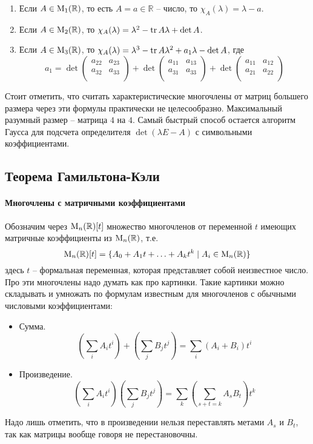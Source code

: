 \begin{enumerate}
\item Если $A\in\operatorname{M}_{1}(\mathbb R)$, то есть $A = a\in\mathbb R$ -- число, то $\chi_A(\lambda) = \lambda - a$.

\item Если $A\in\operatorname{M}_{2}(\mathbb R)$, то $\chi_A(\lambda) = \lambda^2 - \operatorname{tr} A \lambda + \det A$.

\item Если $A\in\operatorname{M}_{3}(\mathbb R)$, то $\chi_A(\lambda) = \lambda^3 - \operatorname{tr} A \lambda^2 + a_1 \lambda - \det A$, где
\[
a_1 = 
\det
\begin{pmatrix}
{a_{22}}&{a_{23}}\\
{a_{32}}&{a_{33}}\\
\end{pmatrix}
+
\det
\begin{pmatrix}
{a_{11}}&{a_{13}}\\
{a_{31}}&{a_{33}}\\
\end{pmatrix}
+
\det
\begin{pmatrix}
{a_{11}}&{a_{12}}\\
{a_{21}}&{a_{22}}\\
\end{pmatrix}
\]
\end{enumerate}

Стоит отметить, что считать характеристические многочлены от матриц большего размера через эти формулы практически не целесообразно. Максимальный разумный размер -- матрица $4$ на $4$. Самый быстрый способ остается алгоритм Гаусса для подсчета определителя $\det(\lambda E - A)$ с символьными коэффициентами.


\subsection{Теорема Гамильтона-Кэли}

\paragraph{Многочлены с матричными коэффициентами}

Обозначим через $\operatorname{M}_{n}(\mathbb R)[t]$ множество многочленов от переменной $t$ имеющих матричные коэффициенты из $\operatorname{M}_{n}(\mathbb R)$, т.е.
\[
\operatorname{M}_{n}(\mathbb R)[t] = \{A_0+A_1t+\ldots + A_k t^k\mid A_i\in \operatorname{M}_{n}(\mathbb R)\}
\]
здесь $t$ -- формальная переменная, которая представляет собой неизвестное число. Про эти многочлены надо думать как про картинки. Такие картинки можно складывать и умножать по формулам известным для многочленов с обычными числовыми коэффициентами:
\begin{itemize}
\item Сумма. 
\[
\left(\sum_{i}A_i t^i\right) +\left (\sum_{j}B_j t^j\right) = \sum_{i}(A_i+ B_i) t^i
\]
\item Произведение.
\[
\left(\sum_i A_i t^i\right)\left( \sum_j B_j t^j\right) = \sum_k \left(\sum_{s+t = k}A_s B_t\right)t^k
\]
\end{itemize}
Надо лишь отметить, что в произведении нельзя переставлять метами $A_s$ и $B_t$, так как матрицы вообще говоря не перестановочны.

